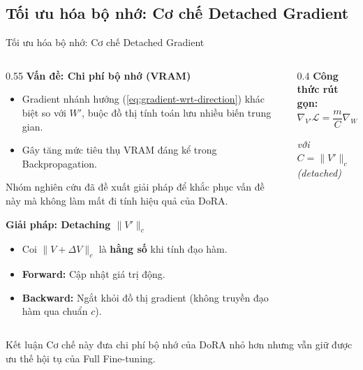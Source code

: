 \documentclass[11pt,aspectratio=169]{beamer}
\begin{document}
\subsection{Tối ưu hóa bộ nhớ: Cơ chế Detached Gradient}
\begin{frame}[t]{Tối ưu hóa bộ nhớ: Cơ chế Detached Gradient}
\scriptsize

\begin{columns}[T] %

    \begin{column}{0.55\textwidth}
        \textbf{Vấn đề: Chi phí bộ nhớ (VRAM)}
        \begin{itemize}
            \item Gradient nhánh hướng (\ref{eq:gradient-wrt-direction}) khác biệt so với $W'$, buộc đồ thị tính toán lưu nhiều biến trung gian.
            \item Gây tăng mức tiêu thụ VRAM đáng kể trong Backpropagation.
        \end{itemize}
Nhóm nghiên cứu đã đề xuất giải pháp để khắc phục vấn đề này mà không làm mất đi tính hiệu quả của DoRA.

        \vspace{0.2cm}
        \textbf{Giải pháp: Detaching $\|V'\|_c$}
        \begin{itemize}
            \item Coi $\|V + \Delta V\|_c$ là \textbf{hằng số} khi tính đạo hàm.
            \item \textbf{Forward:} Cập nhật giá trị động.
            \item \textbf{Backward:} Ngắt khỏi đồ thị gradient (không truyền đạo hàm qua chuẩn $c$).
        \end{itemize}
    \end{column}

    \begin{column}{0.4\textwidth}
        \textbf{Công thức rút gọn:}
        $$
            \nabla_{V'} \mathcal{L} = \frac{m}{C} \nabla_{W'} \mathcal{L}
        $$
        \begin{center}
            \textit{với $C = \|V'\|_c$ (detached)}
        \end{center}
        

    \end{column}

\end{columns}

\vspace{0.3cm}
\begin{block}{Kết luận}
Cơ chế này đưa chi phí bộ nhớ của DoRA nhỏ hơn nhưng vẫn giữ được ưu thế hội tụ của Full Fine-tuning.
\end{block}

\end{frame}
\end{document}
